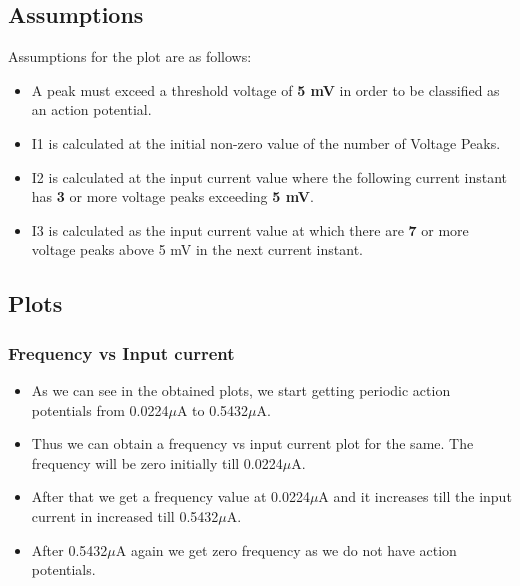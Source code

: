 \documentclass{article}
\begin{document}
\subsection{Assumptions}
Assumptions for the plot are as follows:
\begin{itemize}
    \item A peak must exceed a threshold voltage of \textbf{5 mV} in order to be classified as an action potential.
    \item I1 is calculated at the initial non-zero value of the number of Voltage Peaks.
    \item I2 is calculated at the input current value where the following current instant has \textbf{3} or more voltage peaks exceeding \textbf{5 mV}.
    \item I3 is calculated as the input current value at which there are \textbf{7} or more voltage peaks above 5 mV in the next current instant.
\end{itemize}
\subsection{Plots}
\subsubsection{Frequency vs Input current}
\begin{itemize}
    \item As we can see in the obtained plots, we start getting periodic action potentials from 0.0224$\mu$A to 0.5432$\mu$A.\\
    \item Thus we can obtain a frequency vs input current plot for the same. The frequency will be zero initially till 0.0224$\mu$A.\\
    \item After that we get a frequency value at 0.0224$\mu$A and it increases till the input current in increased till 0.5432$\mu$A.\\
    \item After 0.5432$\mu$A again we get zero frequency as we do not have action potentials.
\end{itemize}
\newpage
\end{document}
